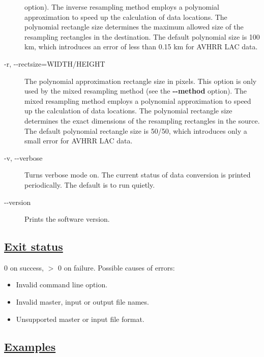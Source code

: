 \begin{description}
 option). The inverse resampling method employs a polynomial approximation to speed up the calculation of data locations. The polynomial rectangle size determines the maximum allowed size of the resampling rectangles in the destination. The default polynomial size is 100 km, which introduces an error of less than 0.15 km for AVHRR LAC data.
\item[-r, -{-}rectsize=WIDTH/HEIGHT]The polynomial approximation rectangle size in pixels. This option is only used by the mixed resampling method (see the \textbf{-{-}method}
 option). The mixed resampling method employs a polynomial approximation to speed up the calculation of data locations. The polynomial rectangle size determines the exact dimensions of the resampling rectangles in the source. The default polynomial rectangle size is 50/50, which introduces only a small error for AVHRR LAC data.
\item[-v, -{-}verbose]Turns verbose mode on. The current status of data conversion is printed periodically. The default is to run quietly.
\item[-{-}version]Prints the software version.

\end{description}
\subsection*{\underline{Exit status}}


  0 on success, $>$ 0 on failure. Possible causes of errors: \begin{itemize}
\item  Invalid command line option. 
\item  Invalid master, input or output file names. 
\item  Unsupported master or input file format. 

\end{itemize}

\subsection*{\underline{Examples}}


